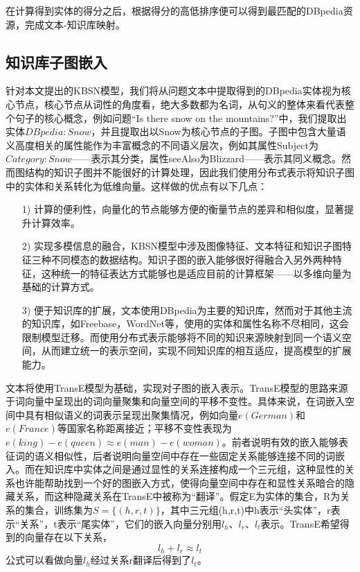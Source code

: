 在计算得到实体的得分之后，根据得分的高低排序便可以得到最匹配的DBpedia资源，完成文本-知识库映射。


\subsection{知识库子图嵌入}
针对本文提出的KBSN模型，我们将从问题文本中提取得到的DBpedia实体视为核心节点，核心节点从词性的角度看，绝大多数都为名词，从句义的整体来看代表整个句子的核心概念，例如问题“Is there snow on the mountains?”中，我们提取出实体$DBpedia:Snow$，并且提取出以Snow为核心节点的子图。子图中包含大量语义高度相关的属性能作为丰富概念的不同语义层次，例如其属性Subject为$Category:Snow$——表示其分类，属性seeAlso为Blizzard——表示其同义概念。然而图结构的知识子图并不能很好的计算处理，因此我们使用分布式表示将知识子图中的实体和关系转化为低维向量。这样做的优点有以下几点：
\begin{itemize}
  \item [1)] 
  计算的便利性，向量化的节点能够方便的衡量节点的差异和相似度，显著提升计算效率。 
  \item [2)]
  实现多模信息的融合，KBSN模型中涉及图像特征、文本特征和知识子图特征三种不同模态的数据结构。知识子图的嵌入能够很好得融合入另外两种特征，这种统一的特征表达方式能够也是适应目前的计算框架——以多维向量为基础的计算方式。
  \item [3)]
  便于知识库的扩展，文本使用DBpedia为主要的知识库，然而对于其他主流的知识库，如Freebase，WordNet等，使用的实体和属性名称不尽相同，这会限制模型迁移。而使用分布式表示能够将不同的知识来源映射到同一个语义空间，从而建立统一的表示空间，实现不同知识库的相互适应，提高模型的扩展能力。
\end{itemize}

文本将使用TransE模型为基础，实现对子图的嵌入表示。TransE模型的思路来源于词向量中呈现出的词向量聚集和向量空间的平移不变性。具体来说，在词嵌入空间中具有相似语义的词表示呈现出聚集情况，例如向量$e(German)$和$e(France)$等国家名称距离接近；平移不变性表现为$e(king)-e(queen)\approx e(man)-e(woman)$。前者说明有效的嵌入能够表征词的语义相似性，后者说明向量空间中存在一些固定关系能够连接不同的词嵌入。而在知识库中实体之间是通过显性的关系连接构成一个三元组，这种显性的关系也许能帮助找到一个好的图嵌入方式，使得向量空间中存在和显性关系暗合的隐藏关系，而这种隐藏关系在TransE中被称为“翻译”。假定E为实体的集合，R为关系的集合，训练集为$S=\{(h,r,t)\}$，其中三元组(h,r,t)中h表示“头实体”，r表示“关系”，t表示“尾实体”，它们的嵌入向量分别用$l_h$、$l_r$、$l_t$表示。TransE希望得到的向量存在以下关系，
\begin{equation}
l_h+l_r \approx l_t
\end{equation}
公式可以看做向量$l_h$经过关系r翻译后得到了$l_t$。

